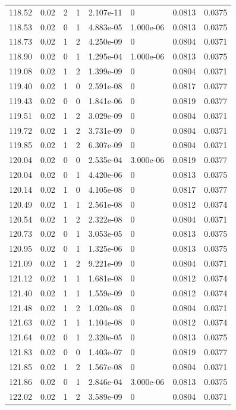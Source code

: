 \documentclass[preview]{standalone}
\begin{document}
{{{{{{{{{{{{{{{{{{{\begin{tabular}{L{1.2cm}C{1.2cm} C{0.3cm}C{0.5cm} C{1.4cm}C{1.4cm} C{1.4cm}C{1.4cm}}
  118.52  &  0.02  & 2     &  1 &  2.107e-11  & 0  & 0.0813 &  0.0375   \\ 
  118.53  &  0.02  & 0     &  1 &  4.883e-05  & 1.000e-06  & 0.0813 &  0.0375   \\ 
  118.73  &  0.02  & 1     &  2 &  4.250e-09  & 0  & 0.0804 &  0.0371   \\ 
  118.90  &  0.02  & 0     &  1 &  1.295e-04  & 1.000e-06  & 0.0813 &  0.0375   \\ 
  119.08  &  0.02  & 1     &  2 &  1.399e-09  & 0  & 0.0804 &  0.0371   \\ 
  119.40  &  0.02  & 1     &  0 &  2.591e-08  & 0  & 0.0817 &  0.0377   \\ 
  119.43  &  0.02  & 0     &  0 &  1.841e-06  & 0  & 0.0819 &  0.0377   \\ 
  119.51  &  0.02  & 1     &  2 &  3.029e-09  & 0  & 0.0804 &  0.0371   \\ 
  119.72  &  0.02  & 1     &  2 &  3.731e-09  & 0  & 0.0804 &  0.0371   \\ 
  119.85  &  0.02  & 1     &  2 &  6.307e-09  & 0  & 0.0804 &  0.0371   \\ 
  120.04  &  0.02  & 0     &  0 &  2.535e-04  & 3.000e-06  & 0.0819 &  0.0377   \\ 
  120.04  &  0.02  & 0     &  1 &  4.420e-06  & 0  & 0.0813 &  0.0375   \\ 
  120.14  &  0.02  & 1     &  0 &  4.105e-08  & 0  & 0.0817 &  0.0377   \\ 
  120.49  &  0.02  & 1     &  1 &  2.561e-08  & 0  & 0.0812 &  0.0374   \\ 
  120.54  &  0.02  & 1     &  2 &  2.322e-08  & 0  & 0.0804 &  0.0371   \\ 
  120.73  &  0.02  & 0     &  1 &  3.053e-05  & 0  & 0.0813 &  0.0375   \\ 
  120.95  &  0.02  & 0     &  1 &  1.325e-06  & 0  & 0.0813 &  0.0375   \\ 
  121.09  &  0.02  & 1     &  2 &  9.221e-09  & 0  & 0.0804 &  0.0371   \\ 
  121.12  &  0.02  & 1     &  1 &  1.681e-08  & 0  & 0.0812 &  0.0374   \\ 
  121.40  &  0.02  & 1     &  1 &  1.559e-09  & 0  & 0.0812 &  0.0374   \\ 
  121.48  &  0.02  & 1     &  2 &  1.020e-08  & 0  & 0.0804 &  0.0371   \\ 
  121.63  &  0.02  & 1     &  1 &  1.104e-08  & 0  & 0.0812 &  0.0374   \\ 
  121.64  &  0.02  & 0     &  1 &  2.320e-05  & 0  & 0.0813 &  0.0375   \\ 
  121.83  &  0.02  & 0     &  0 &  1.403e-07  & 0  & 0.0819 &  0.0377   \\ 
  121.85  &  0.02  & 1     &  2 &  1.567e-08  & 0  & 0.0804 &  0.0371   \\ 
  121.86  &  0.02  & 0     &  1 &  2.846e-04  & 3.000e-06  & 0.0813 &  0.0375   \\ 
  122.02  &  0.02  & 1     &  2 &  3.589e-09  & 0  & 0.0804 &  0.0371   \\ 
\hline 
\end{tabular} 

}}}}}}}}}}}}}}}}}}}
\end{document}
